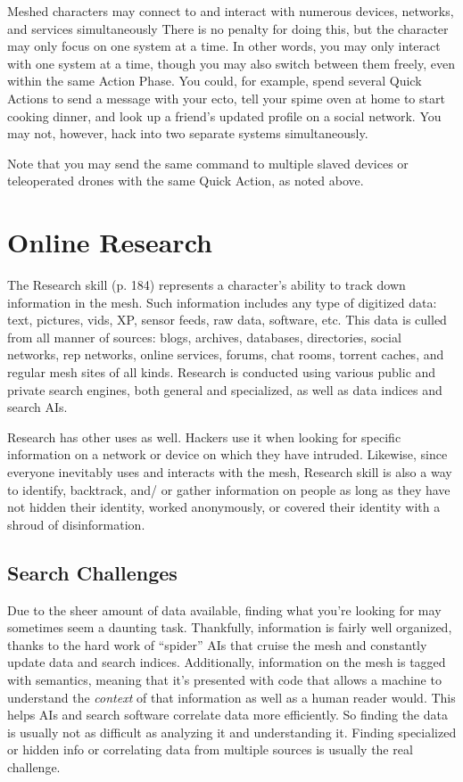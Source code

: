 Meshed characters may connect to and interact with 
numerous devices, networks, and services simultaneously
There is no penalty for doing this, but the
character may only focus on one system at a time. In 
other words, you may only interact with one system 
at a time, though you may also switch between them 
freely, even within the same Action Phase. You could, 
for example, spend several Quick Actions to send a 
message with your ecto, tell your spime oven at home 
to start cooking dinner, and look up a friend's updated 
profile on a social network. You may not, however, 
hack into two separate systems simultaneously.

Note that you may send the same command to 
multiple slaved devices or teleoperated drones with 
the same Quick Action, as noted above.

\section{Online Research}

The Research skill (p. 184) represents a character's 
ability to track down information in the mesh. Such 
information includes any type of digitized data: text, 
pictures, vids, XP, sensor feeds, raw data, software, etc. 
This data is culled from all manner of sources: blogs, 
archives, databases, directories, social networks, rep 
networks, online services, forums, chat rooms, torrent 
caches, and regular mesh sites of all kinds. Research 
is conducted using various public and private search 
engines, both general and specialized, as well as data 
indices and search AIs.

Research has other uses as well. Hackers use it 
when looking for specific information on a network or 
device on which they have intruded. Likewise, since 
everyone inevitably uses and interacts with the mesh, 
Research skill is also a way to identify, backtrack, and/
or gather information on people as long as they have 
not hidden their identity, worked anonymously, or 
covered their identity with a shroud of disinformation.

\subsection{Search Challenges}

Due to the sheer amount of data available, finding
what you're looking for may sometimes seem a
daunting task. Thankfully, information is fairly well 
organized, thanks to the hard work of ``spider'' AIs 
that cruise the mesh and constantly update data and 
search indices. Additionally, information on the mesh 
is tagged with semantics, meaning that it's presented 
with code that allows a machine to understand the 
\textit{context }of that information as well as a human reader 
would. This helps AIs and search software correlate 
data more efficiently. So finding the data is usually not 
as difficult as analyzing it and understanding it. Finding
specialized or hidden info or correlating data from
multiple sources is usually the real challenge.


